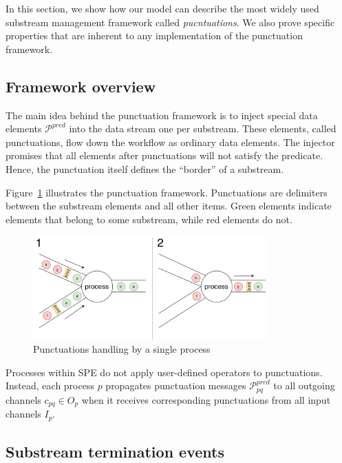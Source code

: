 In this section, we show how our model can describe the most widely used substream management framework called {\em pucntuations}. We also prove specific properties that are inherent to any implementation of the punctuation framework. 

\subsection{Framework overview}

The main idea behind the punctuation framework is to inject special data elements $\mathcal{P}^{pred}$ into the data stream one per substream. These elements, called punctuations, flow down the workflow as ordinary data elements. The injector promises that all elements after punctuations will not satisfy the predicate. Hence, the punctuation itself defines the ``border'' of a substream.

Figure~\ref{punctuations_scheme} illustrates the punctuation framework. Punctuations are delimiters between the substream elements and all other items. Green elements indicate elements that belong to some substream, while red elements do not.

\begin{figure}[t]
  \centering
  \includegraphics[width=0.80\textwidth]{Chapters/SubstreamConsistency/pics/punctuations-scheme.pdf}
  \caption{Punctuations handling by a single process}
  \label{punctuations_scheme}
\end{figure}

Processes within SPE do not apply user-defined operators to punctuations. Instead, each process $p$ propagates punctuation messages $\mathcal{P}_{pq}^{pred}$ to all outgoing channels $c_{pq} \in O_p$  when it receives corresponding punctuations from all input channels $I_p$.

\subsection{Substream termination events}

